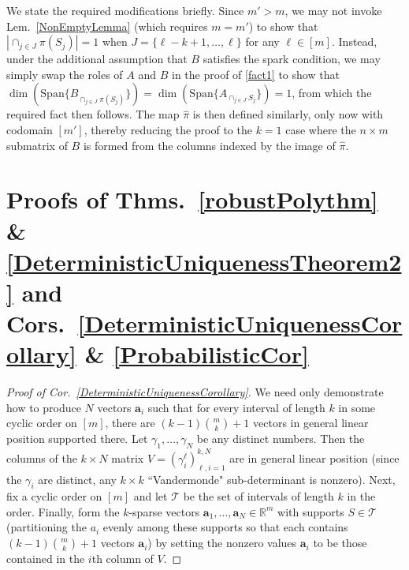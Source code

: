 \documentclass[journal, twocolumn]{IEEEtran}
\newtheorem{remark}{Remark}
\begin{document}
We state the required modifications briefly. Since $m' > m$, we may not invoke Lem.~\ref{NonEmptyLemma} (which requires $m = m'$) to show that $|\cap_{j \in J} \pi(S_j)| = 1$ when $J = \{\ell-k+1, \ldots, \ell\}$ for any $\ell \in [m]$. Instead, under the additional assumption that $B$ satisfies the spark condition, we may simply swap the roles of $A$ and $B$ in the proof of \eqref{fact1} to show that $\dim(\text{Span}\{B_{\cap_{j \in J}\pi(S_j)}\}) = \dim(\text{Span}\{A_{\cap_{j \in J} S_j}\}) = 1$, from which the required fact then follows. The map $\hat \pi$ is then defined similarly, only now with codomain $[m']$, thereby reducing the proof to the $k=1$ case where the $n \times m$ submatrix of $B$ is formed from the columns indexed by the image of $\hat \pi$. 



\section{Proofs of Thms.~\ref{robustPolythm} \& \ref{DeterministicUniquenessTheorem2} and Cors.~\ref{DeterministicUniquenessCorollary} \& \ref{ProbabilisticCor}}\label{AppendixB}

\begin{proof}[Proof of Cor.~\ref{DeterministicUniquenessCorollary}]
We need only demonstrate how to produce $N$ vectors $\mathbf{a}_i$ such that for every interval of length $k$ in some cyclic order on $[m]$, there are  \mbox{$(k-1){m \choose k}+1$} vectors in general linear position supported there. Let $\gamma_1, \ldots, \gamma_N$ be any distinct numbers. Then the columns of the $k \times N$ matrix $V = (\gamma^{\ell}_i)^{k,N}_{\ell,i=1}$ are in general linear position (since the $\gamma_i$ are distinct, any $k \times k$ ``Vandermonde" sub-determinant is nonzero). Next, fix a cyclic order on $[m]$ and let $\mathcal{T}$ be the set of intervals of length $k$ in the order. Finally, form the $k$-sparse vectors $\mathbf{a}_1, \ldots, \mathbf{a}_N \in \mathbb{R}^m$ with supports $S \in \mathcal{T}$ (partitioning the $a_i$ evenly among these supports so that each contains $(k-1){m \choose k}+1$ vectors $\mathbf{a}_i$) by setting the nonzero values $\mathbf{a}_i$ to be those contained in the $i$th column of $V$.
\end{proof}
\end{document}
